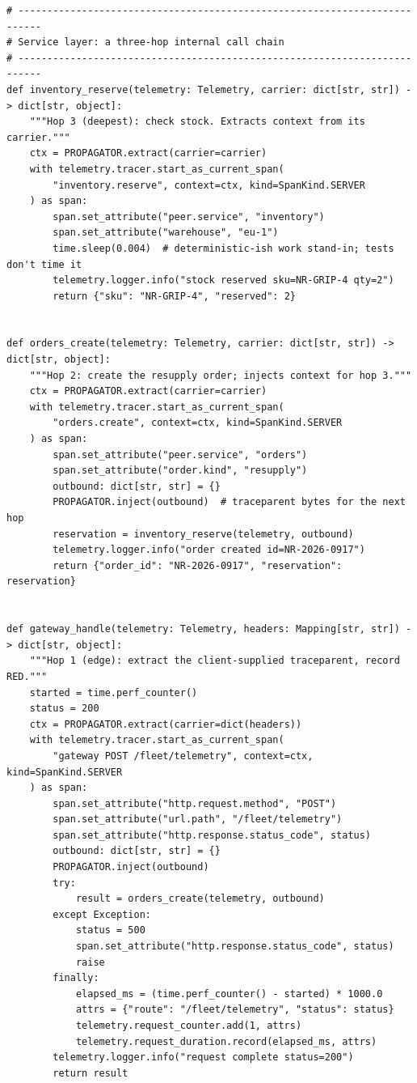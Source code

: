 \begin{verbatim}
# --------------------------------------------------------------------------
# Service layer: a three-hop internal call chain
# --------------------------------------------------------------------------
def inventory_reserve(telemetry: Telemetry, carrier: dict[str, str]) -> dict[str, object]:
    """Hop 3 (deepest): check stock. Extracts context from its carrier."""
    ctx = PROPAGATOR.extract(carrier=carrier)
    with telemetry.tracer.start_as_current_span(
        "inventory.reserve", context=ctx, kind=SpanKind.SERVER
    ) as span:
        span.set_attribute("peer.service", "inventory")
        span.set_attribute("warehouse", "eu-1")
        time.sleep(0.004)  # deterministic-ish work stand-in; tests don't time it
        telemetry.logger.info("stock reserved sku=NR-GRIP-4 qty=2")
        return {"sku": "NR-GRIP-4", "reserved": 2}


def orders_create(telemetry: Telemetry, carrier: dict[str, str]) -> dict[str, object]:
    """Hop 2: create the resupply order; injects context for hop 3."""
    ctx = PROPAGATOR.extract(carrier=carrier)
    with telemetry.tracer.start_as_current_span(
        "orders.create", context=ctx, kind=SpanKind.SERVER
    ) as span:
        span.set_attribute("peer.service", "orders")
        span.set_attribute("order.kind", "resupply")
        outbound: dict[str, str] = {}
        PROPAGATOR.inject(outbound)  # traceparent bytes for the next hop
        reservation = inventory_reserve(telemetry, outbound)
        telemetry.logger.info("order created id=NR-2026-0917")
        return {"order_id": "NR-2026-0917", "reservation": reservation}


def gateway_handle(telemetry: Telemetry, headers: Mapping[str, str]) -> dict[str, object]:
    """Hop 1 (edge): extract the client-supplied traceparent, record RED."""
    started = time.perf_counter()
    status = 200
    ctx = PROPAGATOR.extract(carrier=dict(headers))
    with telemetry.tracer.start_as_current_span(
        "gateway POST /fleet/telemetry", context=ctx, kind=SpanKind.SERVER
    ) as span:
        span.set_attribute("http.request.method", "POST")
        span.set_attribute("url.path", "/fleet/telemetry")
        span.set_attribute("http.response.status_code", status)
        outbound: dict[str, str] = {}
        PROPAGATOR.inject(outbound)
        try:
            result = orders_create(telemetry, outbound)
        except Exception:
            status = 500
            span.set_attribute("http.response.status_code", status)
            raise
        finally:
            elapsed_ms = (time.perf_counter() - started) * 1000.0
            attrs = {"route": "/fleet/telemetry", "status": status}
            telemetry.request_counter.add(1, attrs)
            telemetry.request_duration.record(elapsed_ms, attrs)
        telemetry.logger.info("request complete status=200")
        return result



\end{verbatim}
